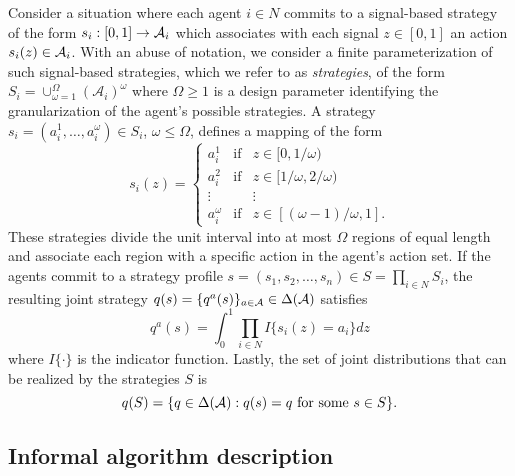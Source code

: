 Consider a situation where each agent $i \in N$ commits to a signal-based strategy of the form $s_i : [0,1] \rightarrow {\cal A}_i$ which associates with each signal $z \in [0,1]$ an action $s_i(z) \in {\cal A}_i$.  With an abuse of notation, we consider a finite parameterization of such signal-based strategies, which we refer to as {\it strategies}, of the form $S_i = \cup_{\omega=1}^\Omega (\mathcal{A}_i)^\omega$ 
where $\Omega \geq 1$ is a design parameter identifying the granularization of the agent's possible strategies.  A strategy $s_i = (a_i^1,\ldots,a_i^\omega) \in S_i$, $\omega \leq \Omega$, defines a mapping of the form
%
\begin{equation}
%
s_i(z) = \left\{ \begin{array}{ccl} 
a_i^1 & \text{if} & z \in [0,1/\omega) \\ 
a_i^2 & \text{if} & z \in [1/\omega,2/\omega) \\
\vdots & & \vdots \\
a_i^\omega & \text{if} & z \in [(\omega-1)/\omega,1]. 
\end{array}
\right. 
%
\end{equation} 
%
These strategies divide the unit interval into at most $\Omega$ regions of equal length and associate each region with a specific action in the agent's action set.  If the agents commit to a strategy profile $s = (s_1, s_2, \dots, s_n) \in S = \prod_{i \in N} S_i$, the resulting joint strategy $q(s)=\{q^a(s)\}_{a \in {\cal A}} \in \Delta({\cal A})$ satisfies
%
$$ q^a(s) = \int_{0}^1 \prod_{i \in N} I \{s_i(z) = a_i\} dz $$
%
where $I\{\cdot\}$ is the indicator function.  Lastly, the set of joint distributions that can be realized by the strategies $S$ is
%
$$ q(S) = \{ q \in \Delta({{\cal A}}) : q(s) = q \ \text{for some} \ s \in S \}. $$
 
\subsection{Informal algorithm description}\label{s:algorithm}

